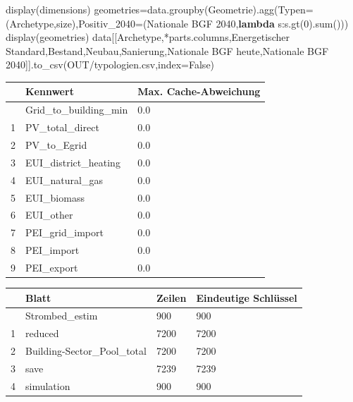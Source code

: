 \documentclass[
  ngerman,
  a4paper,
  DIV=11]{scrreprt}
\newenvironment{Shaded}{\begin{snugshade}}{\end{snugshade}}
\newcommand{\BuiltInTok}[1]{\textcolor[rgb]{0.00,0.23,0.31}{#1}}
\newcommand{\DecValTok}[1]{\textcolor[rgb]{0.68,0.00,0.00}{#1}}
\newcommand{\KeywordTok}[1]{\textcolor[rgb]{0.00,0.23,0.31}{\textbf{#1}}}
\newcommand{\NormalTok}[1]{\textcolor[rgb]{0.00,0.23,0.31}{#1}}
\newcommand{\OperatorTok}[1]{\textcolor[rgb]{0.37,0.37,0.37}{#1}}
\newcommand{\StringTok}[1]{\textcolor[rgb]{0.13,0.47,0.30}{#1}}
\newcommand{\VariableTok}[1]{\textcolor[rgb]{0.07,0.07,0.07}{#1}}
\newcounter{none} %
\begin{document}
\begin{Shaded}
\begin{Highlighting}[]
\NormalTok{display(dimensions)}
\NormalTok{geometries}\OperatorTok{=}\NormalTok{data.groupby(}\StringTok{\textquotesingle{}Geometrie\textquotesingle{}}\NormalTok{).agg(Typen}\OperatorTok{=}\NormalTok{(}\StringTok{\textquotesingle{}Archetype\textquotesingle{}}\NormalTok{,}\StringTok{\textquotesingle{}size\textquotesingle{}}\NormalTok{),Positiv\_2040}\OperatorTok{=}\NormalTok{(}\StringTok{\textquotesingle{}Nationale BGF 2040\textquotesingle{}}\NormalTok{,}\KeywordTok{lambda}\NormalTok{ s:s.gt(}\DecValTok{0}\NormalTok{).}\BuiltInTok{sum}\NormalTok{()))}
\NormalTok{display(geometries)}
\NormalTok{data[[}\StringTok{\textquotesingle{}Archetype\textquotesingle{}}\NormalTok{,}\OperatorTok{*}\NormalTok{parts.columns,}\StringTok{\textquotesingle{}Energetischer Standard\textquotesingle{}}\NormalTok{,}\StringTok{\textquotesingle{}Bestand\textquotesingle{}}\NormalTok{,}\StringTok{\textquotesingle{}Neubau\textquotesingle{}}\NormalTok{,}\StringTok{\textquotesingle{}Sanierung\textquotesingle{}}\NormalTok{,}\StringTok{\textquotesingle{}Nationale BGF heute\textquotesingle{}}\NormalTok{,}\StringTok{\textquotesingle{}Nationale BGF 2040\textquotesingle{}}\NormalTok{]].to\_csv(OUT}\OperatorTok{/}\StringTok{\textquotesingle{}typologien.csv\textquotesingle{}}\NormalTok{,index}\OperatorTok{=}\VariableTok{False}\NormalTok{)}
\end{Highlighting}
\end{Shaded}

{\def\LTcaptype{none} %
\begin{longtable}[]{@{}lll@{}}
\toprule\noalign{}
& Kennwert & Max. Cache-Abweichung \\
\midrule\noalign{}
\endhead
\bottomrule\noalign{}
\endlastfoot
0 & Grid\_to\_building\_min & 0.0 \\
1 & PV\_total\_direct & 0.0 \\
2 & PV\_to\_Egrid & 0.0 \\
3 & EUI\_district\_heating & 0.0 \\
4 & EUI\_natural\_gas & 0.0 \\
5 & EUI\_biomass & 0.0 \\
6 & EUI\_other & 0.0 \\
7 & PEI\_grid\_import & 0.0 \\
8 & PEI\_import & 0.0 \\
9 & PEI\_export & 0.0 \\
\end{longtable}
}

{\def\LTcaptype{none} %
\begin{longtable}[]{@{}llll@{}}
\toprule\noalign{}
& Blatt & Zeilen & Eindeutige Schlüssel \\
\midrule\noalign{}
\endhead
\bottomrule\noalign{}
\endlastfoot
0 & Strombed\_estim & 900 & 900 \\
1 & reduced & 7200 & 7200 \\
2 & Building-Sector\_Pool\_total & 7200 & 7200 \\
3 & save & 7239 & 7239 \\
4 & simulation & 900 & 900 \\
\end{longtable}
}
\end{document}
